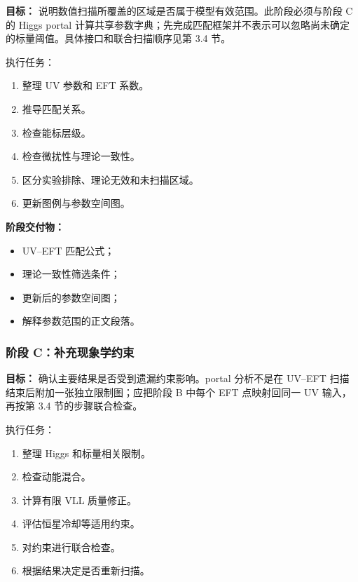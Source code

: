 \documentclass[
  chinese,
  UTF8]{ctexart}
\providecommand{\tightlist}{%
  \setlength{\itemsep}{0pt}\setlength{\parskip}{0pt}}
\begin{document}
\textbf{目标：}
说明数值扫描所覆盖的区域是否属于模型有效范围。此阶段必须与阶段 C 的
Higgs portal
计算共享参数字典；先完成匹配框架并不表示可以忽略尚未确定的标量阈值。具体接口和联合扫描顺序见第
3.4 节。

执行任务：

\begin{enumerate}
\def\labelenumi{\arabic{enumi}.}
\tightlist
\item
  整理 UV 参数和 EFT 系数。
\item
  推导匹配关系。
\item
  检查能标层级。
\item
  检查微扰性与理论一致性。
\item
  区分实验排除、理论无效和未扫描区域。
\item
  更新图例与参数空间图。
\end{enumerate}

\textbf{阶段交付物：}

\begin{itemize}
\tightlist
\item
  UV--EFT 匹配公式；
\item
  理论一致性筛选条件；
\item
  更新后的参数空间图；
\item
  解释参数范围的正文段落。
\end{itemize}

\subsubsection{阶段
C：补充现象学约束}\label{ux9636ux6bb5-cux8865ux5145ux73b0ux8c61ux5b66ux7ea6ux675f}

\textbf{目标：} 确认主要结果是否受到遗漏约束影响。portal 分析不是在
UV--EFT 扫描结束后附加一张独立限制图；应把阶段 B 中每个 EFT 点映射回同一
UV 输入，再按第 3.4 节的步骤联合检查。

执行任务：

\begin{enumerate}
\def\labelenumi{\arabic{enumi}.}
\tightlist
\item
  整理 Higgs 和标量相关限制。
\item
  检查动能混合。
\item
  计算有限 VLL 质量修正。
\item
  评估恒星冷却等适用约束。
\item
  对约束进行联合检查。
\item
  根据结果决定是否重新扫描。
\end{enumerate}
\end{document}

